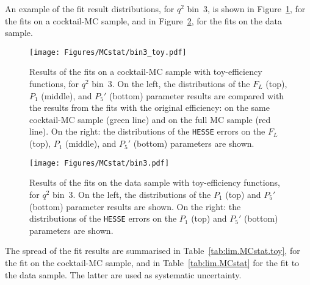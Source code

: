 An example of the fit result distributions, for $q^2$ bin~3, is shown in Figure~\ref{fig:BKG-bin3-toy}, for the fits on a cocktail-MC sample, and in Figure~\ref{fig:BKG-bin3}, for the fits on the data sample.

\begin{figure}[!hbt]
  \centering
  \texttt{[image: Figures/MCstat/bin3\_toy.pdf]}
  \caption{Results of the fits on a cocktail-MC sample with toy-efficiency functions, for $q^2$ bin~3.
    On the left, the distributions of the $F_L$ (top), $P_1$ (middle), and $P_5'$ (bottom) parameter results are compared with the results from the fits with the original efficiency: on the same cocktail-MC sample (green line) and on the full MC sample (red line).
    On the right: the distributions of the {\tt HESSE} errors on the $F_L$(top), $P_1$ (middle), and $P_5'$ (bottom) parameters are shown.}
  \label{fig:BKG-bin3-toy}
\end{figure}

\begin{figure}[!hbt]
  \centering
  \texttt{[image: Figures/MCstat/bin3.pdf]}
  \caption{Results of the fits on the data sample with toy-efficiency functions, for $q^2$ bin~3.
    On the left, the distributions of the $P_1$ (top) and $P_5'$ (bottom) parameter results are shown.
    On the right: the distributions of the {\tt HESSE} errors on the $P_1$ (top) and $P_5'$ (bottom) parameters are shown.}
  \label{fig:BKG-bin3}
\end{figure}

The spread of the fit results are summarised in Table~\ref{tab:lim.MCstat.toy}, for the fit on the cocktail-MC sample, and in Table~\ref{tab:lim.MCstat} for the fit to the data sample.
The latter are used as systematic uncertainty.

